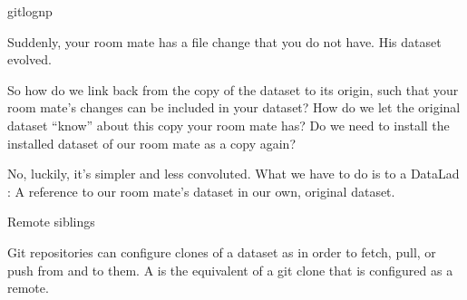 \begin{sphinxVerbatim}[commandchars=\\\{\}]
gitlog\PYGZhy{}n\PYGZhy{}p


\end{sphinxVerbatim}

\sphinxAtStartPar
Suddenly, your room mate has a file change that you do not have.
His dataset evolved.

\sphinxAtStartPar
So how do we link back from the copy of the dataset to its
origin, such that your room mate’s changes can be included in
your dataset? How do we let the original dataset “know” about
this copy your room mate has?
Do we need to install the installed dataset of our room mate
as a copy again?

\sphinxAtStartPar
No, luckily, it’s simpler and less convoluted. What we have to
do is to  a DataLad {\hyperref[\detokenize{glossary:term-sibling}]{}}: A reference to our room mate’s
dataset in our own, original dataset.

\ignorespaces \begin{gitusernote}[label={index-2}, before title={\thetcbcounter\ }, float, floatplacement=tbp, check odd page=true]{Remote siblings}
\label{\detokenize{basics/101-121-siblings:index-2}}

\sphinxAtStartPar
Git repositories can configure clones of a dataset as  in
order to fetch, pull, or push from and to them. A 
is the equivalent of a git clone that is configured as a remote.


\end{gitusernote}

